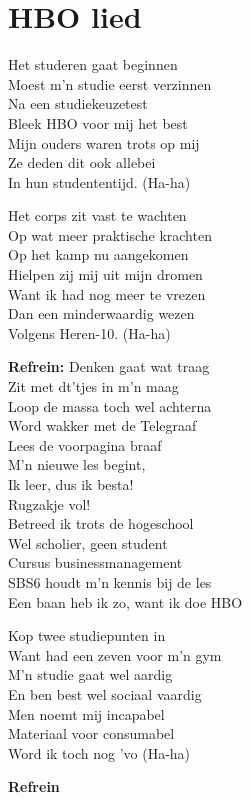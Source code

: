 \section{HBO lied}
Het studeren gaat beginnen\\
Moest m'n studie eerst verzinnen\\
Na een studiekeuzetest\\
Bleek HBO voor mij het best\\
Mijn ouders waren trots op mij\\
Ze deden dit ook allebei\\
In hun studententijd. (Ha-ha)

Het corps zit vast te wachten\\
Op wat meer praktische krachten\\
Op het kamp nu aangekomen\\
Hielpen zij mij uit mijn dromen\\
Want ik had nog meer te vrezen\\
Dan een minderwaardig wezen\\
Volgens Heren-10. (Ha-ha)

\textbf{Refrein:}
Denken gaat wat traag\\
Zit met dt'tjes in m'n maag\\
Loop de massa toch wel achterna\\
Word wakker met de Telegraaf\\
Lees de voorpagina braaf\\
M'n nieuwe les begint,\\
Ik leer, dus ik besta!\\
Rugzakje vol!\\
Betreed ik trots de hogeschool\\
Wel scholier, geen student\\
Cursus businessmanagement\\
SBS6 houdt m'n kennis bij de les\\
Een baan heb ik zo, want ik doe HBO

Kop twee studiepunten in\\
Want had een zeven voor m'n gym\\
M'n studie gaat wel aardig\\
En ben best wel sociaal vaardig\\
Men noemt mij incapabel\\
Materiaal voor consumabel\\
Word ik toch nog 'vo (Ha-ha)

\textbf{Refrein}

